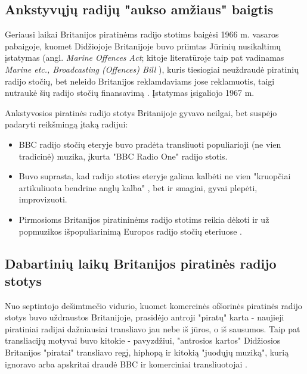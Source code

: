 \documentclass[kursinis-darbas]{vukf}
\begin{document}
\subsection{Ankstyvųjų radijų "aukso amžiaus" baigtis}

Geriausi laikai Britanijos piratinėms radijo stotims baigėsi 1966 m. vasaros pabaigoje, kuomet Didžiojoje Britanijoje buvo priimtas Jūrinių nusikaltimų įstatymas (angl. \emph{Marine Offences Act}; kitoje literatūroje taip pat vadinamas \emph{Marine etc., Broadcasting (Offences) Bill} \cite[p.~139]{hc_key_concepts_in_radio_studies}), kuris tiesiogiai neuždraudė piratinių radijo stočių, bet neleido Britanijos reklamdaviams jose reklamuotis, taigi nutraukė šių radijo stočių finansavimą \cite[p.~238]{chs_encyclopedia_of_radio}. Įstatymas įsigaliojo 1967 m.

Ankstyvosios piratinės radijo stotys Britanijoje gyvavo neilgai, bet suspėjo padaryti reikšmingą įtaką radijui:

\begin{itemize}
	\item \gls{BBC} radijo stočių eteryje buvo pradėta transliuoti populiarioji (ne vien tradicinė) muzika, įkurta "\gls{BBC} Radio One" radijo stotis.
	\item Buvo suprasta, kad radijo stoties eteryje galima kalbėti ne vien "kruopčiai artikuliuota bendrine anglų kalba" \cite[p.~238]{chs_encyclopedia_of_radio}, bet ir smagiai, gyvai plepėti, improvizuoti.
	\item Pirmosioms Britanijos piratininėms radijo stotims reikia dėkoti ir už popmuzikos išpopuliarinimą Europos radijo stočių eteriuose \cite[p.~447]{js_continuum_encyclopedia}.
\end{itemize}


\subsection{Dabartinių laikų Britanijos piratinės radijo stotys}

Nuo septintojo dešimtmečio vidurio, kuomet komercinės ofšorinės piratinės radijo stotys buvo uždraustos Britanijoje, prasidėjo antroji "piratų" karta - naujieji piratiniai radijai dažniausiai transliavo jau nebe iš jūros, o iš sausumos. Taip pat transliacijų motyvai buvo kitokie \cite[p.~448]{js_continuum_encyclopedia} - pavyzdžiui, "antrosios kartos" Didžiosios Britanijos "piratai" transliavo regį, hiphopą ir kitokią "juodųjų muziką", kurią ignoravo arba apskritai draudė \gls{BBC} ir komerciniai transliuotojai \cite[p.~447]{js_continuum_encyclopedia}.
\end{document}
